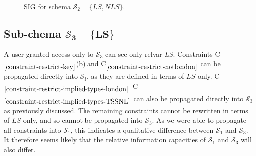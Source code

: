 \documentclass{article}
\newcounter{constraint}
\newcommand{\identifier}[1]{\ensuremath{\mathit{#1}}}
\newcommand{\LS}{\identifier{LS}}
\newcommand{\NLS}{\identifier{NLS}}
\newcommand{\schema}[1]{\ensuremath{\mathcal{S}_{#1}}}
\newcommand{\Constraint}[2][]{C\ensuremath{_{#2}\ifx&#1&\else^{#1}\fi}}
\begin{document}
\begin{figure}
    \caption{SIG for schema \(\schema{2} = \{\LS, \NLS\}\).}
    \label{fig-sig-s-ii-restrict}
\end{figure}





\subsection{Sub-chema \(\bm{\schema{3} = \{LS\}}\)}

\noindent A user granted access only to \(\schema{3}\) can see only relvar \(\LS\). Constraints \Constraint{\ref{constraint-restrict-key}}(b) and \Constraint{\ref{constraint-restrict-notlondon}} can be propagated directly into \(\schema{3}\), as they are defined in terms of \(\LS\) only. \Constraint{\ref{constraint-restrict-implied-types-london}}--\Constraint{\ref{constraint-restrict-implied-types-TSSNL}} can also be propagated directly into \(\schema{3}\) as previously discussed. The remaining constraints cannot be rewritten in terms of \(\LS\) only, and so cannot be propagated into \(\schema{3}\). As we were able to propagate all constraints into \(\schema{1}\), this indicates a qualitative difference between \(\schema{1}\) and \(\schema{3}\). It therefore seems likely that the relative information capacities of \(\schema{1}\) and \(\schema{3}\) will also differ.
\end{document}
